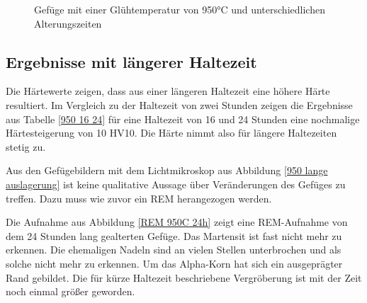 \documentclass[a4paper, 11pt]{tubsreprt}
\begin{document}
\begin{figure} %
    \caption{Gefüge mit einer Glühtemperatur von 950°C und unterschiedlichen Alterungszeiten}
    \label{Glühung950+alterung}
\end{figure}

\newpage
\subsection{Ergebnisse mit längerer Haltezeit}
Die Härtewerte zeigen, dass aus einer längeren Haltezeit eine höhere Härte resultiert. Im Vergleich zu der Haltezeit von zwei Stunden zeigen die Ergebnisse aus Tabelle \ref{950 16 24} für eine Haltezeit von 16 und 24 Stunden eine nochmalige Härtesteigerung von 10 HV10. Die Härte nimmt also für längere Haltezeiten stetig zu. 

Aus den Gefügebildern mit dem Lichtmikroskop aus Abbildung \ref{950 lange auslagerung} ist keine qualitative Aussage über Veränderungen des Gefüges zu treffen. Dazu muss wie zuvor ein REM herangezogen werden.

Die Aufnahme aus Abbildung \ref{REM 950C 24h} zeigt eine REM-Aufnahme von dem 24 Stunden lang gealterten Gefüge. Das Martensit ist fast nicht mehr zu erkennen. Die ehemaligen Nadeln sind an vielen Stellen unterbrochen und als solche nicht mehr zu erkennen. Um das Alpha-Korn hat sich ein ausgeprägter Rand gebildet. Die für kürze Haltezeit beschriebene Vergröberung ist mit der Zeit noch einmal größer geworden.
\end{document}

